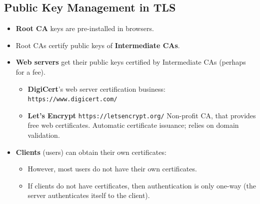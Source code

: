 \documentclass[12pt,titlepage]{article}
\begin{document}
\subsection{Public Key Management in TLS}
\begin{itemize}
	\item \textbf{Root CA} keys are pre-installed in browsers.
	\item Root CAs certify public keys of \textbf{Intermediate CAs}.
	\item \textbf{Web servers} get their public keys certified by Intermediate CAs (perhaps for a fee).\begin{itemize}
		\item \textbf{DigiCert}’s web server certification business: \texttt{https://www.digicert.com/}
		\item \textbf{Let’s Encrypt} \texttt{https://letsencrypt.org/} Non-profit CA, that provides free web certificates. Automatic certificate issuance; relies on domain validation.
	\end{itemize}
	\item \textbf{Clients} (users) can obtain their own certificates: \begin{itemize}
		\item However, most users do not have their own certificates.
		\item If clients do not have certificates, then authentication is only one-way (the server authenticates itself to the client).
	\end{itemize}
\end{itemize}
\end{document}
